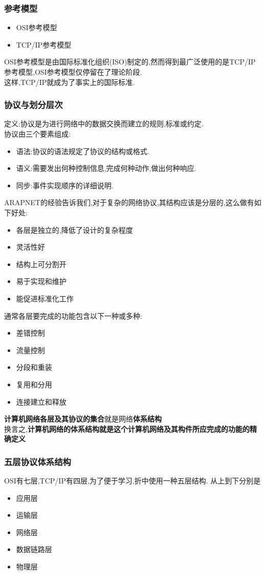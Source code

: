 \documentclass{ctexart}
\begin{document}
\subsubsection{参考模型}
\begin{itemize}
    \item OSI参考模型
    \item TCP/IP参考模型
\end{itemize}
OSI参考模型是由国际标准化组织(ISO)制定的,然而得到最广泛使用的是TCP/IP参考模型,OSI参考模型仅停留在了理论阶段.\\
这样,TCP/IP就成为了事实上的国际标准.
\subsubsection{协议与划分层次}
定义:协议是为进行网络中的数据交换而建立的规则,标准或约定.\\
协议由三个要素组成:
\begin{itemize}
    \item 语法:协议的语法规定了协议的结构或格式.
    \item 语义:需要发出何种控制信息,完成何种动作,做出何种响应.
    \item 同步:事件实现顺序的详细说明.
\end{itemize}
ARAPNET的经验告诉我们,对于复杂的网络协议,其结构应该是分层的,这么做有如下好处:
\begin{itemize}
    \item 各层是独立的,降低了设计的复杂程度
    \item 灵活性好
    \item 结构上可分割开
    \item 易于实现和维护
    \item 能促进标准化工作
\end{itemize}
通常各层要完成的功能包含以下一种或多种:
\begin{itemize}
    \item 差错控制
    \item 流量控制
    \item 分段和重装
    \item 复用和分用
    \item 连接建立和释放
\end{itemize}
\textbf{计算机网络各层及其协议的集合}就是网络\textbf{体系结构}\\
换言之,\textbf{计算机网络的体系结构就是这个计算机网络及其构件所应完成的功能的精确定义}
\subsubsection{五层协议体系结构}
OSI有七层,TCP/IP有四层,为了便于学习,折中使用一种五层结构.
从上到下分别是
\begin{itemize}
    \item 应用层  
    \item 运输层  
    \item 网络层  
    \item 数据链路层
    \item 物理层  
\end{itemize}
\end{document}
